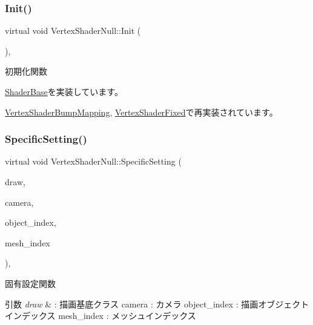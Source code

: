 \subsubsection{\texorpdfstring{Init()}{Init()}}
{\footnotesize\ttfamily virtual void Vertex\+Shader\+Null\+::\+Init (\begin{DoxyParamCaption}{ }\end{DoxyParamCaption})\hspace{0.3cm}{\ttfamily [inline]}, {\ttfamily [virtual]}}



初期化関数 



\mbox{\hyperlink{class_shader_base_a9622b2f5e0184a78d3af82820dc5113d}{Shader\+Base}}を実装しています。



\mbox{\hyperlink{class_vertex_shader_bump_mapping_a6c0f59d1f29fd883943a66bfe61b6b03}{Vertex\+Shader\+Bump\+Mapping}}, \mbox{\hyperlink{class_vertex_shader_fixed_ae829ff736b33c45543804059255125b6}{Vertex\+Shader\+Fixed}}で再実装されています。

\mbox{\label{class_vertex_shader_null_aa2234c6ea083e3c0233d59f222145992}} 
\subsubsection{\texorpdfstring{Specific\+Setting()}{SpecificSetting()}}
{\footnotesize\ttfamily virtual void Vertex\+Shader\+Null\+::\+Specific\+Setting (\begin{DoxyParamCaption}\item[{\mbox{\hyperlink{class_draw_base}{Draw\+Base}} $\ast$}]{draw,  }\item[{\mbox{\hyperlink{class_camera}{Camera}} $\ast$}]{camera,  }\item[{unsigned}]{object\+\_\+index,  }\item[{unsigned}]{mesh\+\_\+index }\end{DoxyParamCaption})\hspace{0.3cm}{\ttfamily [inline]}, {\ttfamily [virtual]}}



固有設定関数 


\begin{DoxyParams}{引数}
{\em draw} & \+: 描画基底クラス camera \+: カメラ object\+\_\+index \+: 描画オブジェクトインデックス mesh\+\_\+index \+: メッシュインデックス \\
\hline
\end{DoxyParams}


